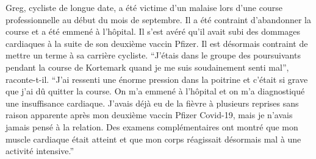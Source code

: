 Greg, cycliste de longue date, a été victime d'un malaise lors d'une course
professionnelle au début du mois de septembre. Il a été contraint d'abandonner
la course et a été emmené à l'hôpital. Il s'est avéré qu'il avait subi des
dommages cardiaques à la suite de son deuxième vaccin Pfizer. Il est désormais
contraint de mettre un terme à sa carrière cycliste. ``J'étais dans le groupe
des poursuivants pendant la course de Kortemark quand je me suis soudainement
senti mal'', raconte-t-il. ``J'ai ressenti une énorme pression dans la poitrine
et c'était si grave que j'ai dû quitter la course. On m'a emmené à l'hôpital et
on m'a diagnostiqué une insuffisance cardiaque. J'avais déjà eu de la fièvre à
plusieurs reprises sans raison apparente après mon deuxième vaccin Pfizer
Covid-19, mais je n'avais jamais pensé à la relation. Des examens
complémentaires ont montré que mon muscle cardiaque était atteint et que mon
corps réagissait désormais mal à une activité intensive.''
